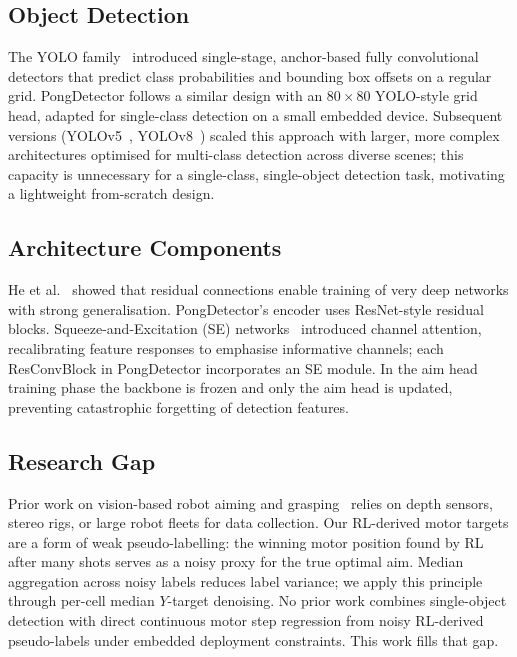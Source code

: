 \documentclass[conference]{IEEEtran}
\begin{document}
\subsection{Object Detection}

The YOLO family~\cite{redmon2016} introduced single-stage, anchor-based fully
convolutional detectors that predict class probabilities and bounding box
offsets on a regular grid.  PongDetector follows a similar design with an
$80{\times}80$ YOLO-style grid head, adapted for single-class detection on a
small embedded device.  Subsequent versions (YOLOv5~\cite{jocher2020},
YOLOv8~\cite{jocher2023}) scaled this approach with larger, more complex
architectures optimised for multi-class detection across diverse scenes; this
capacity is unnecessary for a single-class, single-object detection task,
motivating a lightweight from-scratch design.

\subsection{Architecture Components}

He et al.~\cite{he2016} showed that residual connections enable training of
very deep networks with strong generalisation.  PongDetector's encoder uses
ResNet-style residual blocks.  Squeeze-and-Excitation (SE)
networks~\cite{hu2018} introduced channel attention, recalibrating feature
responses to emphasise informative channels; each ResConvBlock in PongDetector
incorporates an SE module.  In the aim head training phase the backbone is
frozen and only the aim head is updated, preventing catastrophic forgetting of
detection features.

\subsection{Research Gap}

Prior work on vision-based robot aiming and
grasping~\cite{redmon2015,levine2018} relies on depth sensors, stereo rigs, or
large robot fleets for data collection.  Our RL-derived motor targets are a form
of weak pseudo-labelling: the winning motor position found by RL after many
shots serves as a noisy proxy for the true optimal aim.  Median aggregation
across noisy labels reduces label variance; we apply this principle through
per-cell median $Y$-target denoising.  No prior work combines single-object
detection with direct continuous motor step regression from noisy RL-derived
pseudo-labels under embedded deployment constraints.  This work fills that gap.
\end{document}
